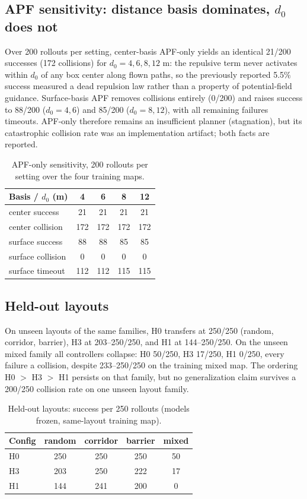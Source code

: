 \documentclass[conference]{IEEEtran}
\begin{document}
\subsection{APF sensitivity: distance basis dominates, $d_0$ does not}
Over 200 rollouts per setting, center-basis APF-only yields an identical 21/200 successes (172 collisions) for
$d_0=4,6,8,12$ m: the repulsive term never activates within $d_0$ of any box center along flown paths, so the
previously reported 5.5\% success measured a dead repulsion law rather than a property of potential-field
guidance. Surface-basis APF removes collisions entirely (0/200) and raises success to 88/200 ($d_0=4,6$) and
85/200 ($d_0=8,12$), with all remaining failures timeouts. APF-only therefore remains an insufficient planner
(stagnation), but its catastrophic collision rate was an implementation artifact; both facts are reported.
\begin{table}[t]
\centering
\caption{APF-only sensitivity, 200 rollouts per setting over the four training maps.}
\label{tab:sens}
\begin{tabular}{lcccc}
\toprule
Basis / $d_0$ (m) & 4 & 6 & 8 & 12\\
\midrule
center success & 21 & 21 & 21 & 21\\
center collision & 172 & 172 & 172 & 172\\
surface success & 88 & 88 & 85 & 85\\
surface collision & 0 & 0 & 0 & 0\\
surface timeout & 112 & 112 & 115 & 115\\
\bottomrule
\end{tabular}
\end{table}
\subsection{Held-out layouts}
On unseen layouts of the same families, H0 transfers at 250/250 (random, corridor, barrier), H3 at 203--250/250,
and H1 at 144--250/250. On the unseen mixed family all controllers collapse: H0 50/250, H3 17/250, H1 0/250,
every failure a collision, despite 233--250/250 on the training mixed map. The ordering H0 $>$ H3 $>$ H1 persists
on that family, but no generalization claim survives a 200/250 collision rate on one unseen layout family.
\begin{table}[t]
\centering
\caption{Held-out layouts: success per 250 rollouts (models frozen, same-layout training map).}
\label{tab:heldout}
\begin{tabular}{lcccc}
\toprule
Config & random & corridor & barrier & mixed\\
\midrule
H0 & 250 & 250 & 250 & 50\\
H3 & 203 & 250 & 222 & 17\\
H1 & 144 & 241 & 200 & 0\\
\bottomrule
\end{tabular}
\end{table}
\end{document}
